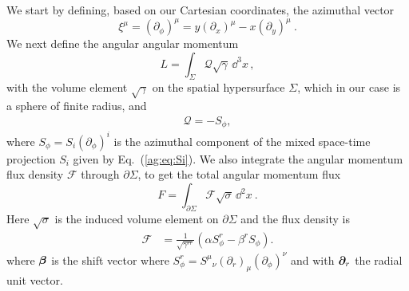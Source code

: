 We start by defining, based on our Cartesian coordinates, the azimuthal vector
\begin{equation}
    {\xi}^\mu = (\partial_{\phi})^\mu = y(\partial_x)^\mu - x (\partial_y)^\mu~.
\end{equation}
We next define the angular angular momentum
\begin{equation}
    \mathbin{{L = \int_{\Sigma} \mathcal{Q} \sqrt{\gamma}\,
    \dd^3x}}\,,
\end{equation}
with the volume element $\sqrt{\gamma}$ on the spatial hypersurface $\Sigma$, which in our case is a sphere of finite radius, and
\begin{align}
    \mathcal{Q} = -S_\phi,
\end{align}
where $S_\phi = S_i (\partial_\phi)^i$ is the azimuthal component of
the mixed space-time projection $S_i$ given by Eq.~(\ref{ag:eq:Si}).
We also integrate the angular momentum flux density $\mathcal{F}$ through
$\partial \Sigma$, to get the total angular momentum flux
\begin{equation}
    \mathbin{{F = \int_{\partial \Sigma} \mathcal{F} \sqrt{\sigma }\,
    \dd^2x}}~.\label{ag:eqn:DefAngMomFlux}
\end{equation}
Here $\sqrt{\sigma}$ is the induced volume element on $\partial \Sigma$ and the flux density is
\begin{align}
    \mathcal{F} &= \frac{1}{\sqrt{\gamma^{rr}}}\left(\alpha S^r_\phi -\beta^r S_\phi\right).
\end{align}
where $\boldsymbol\beta$ is the shift vector where $S^r_\phi = {S^{\mu}}_{\nu} (\partial_r)_{\mu} (\partial_\phi)^{\nu} $ and with $\boldsymbol{\partial}_{r}$ the radial unit vector.

